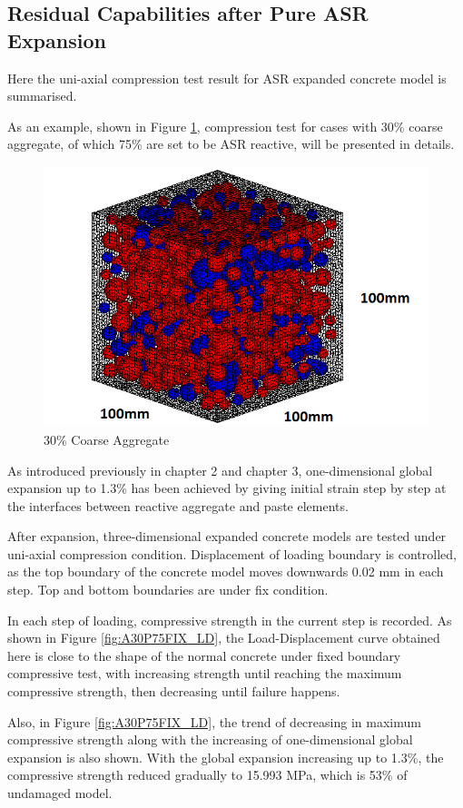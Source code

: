 \clearpage

\subsection{Residual Capabilities after Pure ASR Expansion}

Here the uni-axial compression test result for ASR expanded concrete model is summarised.

As an example, shown in Figure \ref{fig:A30P75_modesl}, compression test for cases with 30\% coarse aggregate, of which 75\% are set to be ASR reactive, will be presented in details.

\begin{figure}[ht!]
\centering
\includegraphics[width=.3\linewidth]{Files/Aggregate/A30P75.png}
  \caption{30\% Coarse Aggregate}
  \label{fig:A30P75_modesl}
\end{figure}

As introduced previously in chapter 2 and chapter 3, one-dimensional global expansion up to 1.3\% has been achieved by giving initial strain step by step at the interfaces between reactive aggregate and paste elements.

After expansion, three-dimensional expanded concrete models are tested under uni-axial compression condition. Displacement of loading boundary is controlled, as the top boundary of the concrete model moves downwards 0.02 mm in each step. Top and bottom boundaries are under fix condition.

In each step of loading, compressive strength in the current step is recorded. As shown in Figure \ref{fig:A30P75FIX_LD}, the Load-Displacement curve obtained here is close to the shape of the normal concrete under fixed boundary compressive test, with increasing strength until reaching the maximum compressive strength, then decreasing until failure happens.

Also, in Figure \ref{fig:A30P75FIX_LD}, the trend of decreasing in maximum compressive strength along with the increasing of one-dimensional global expansion is also shown. With the global expansion increasing up to 1.3\%, the compressive strength reduced gradually to 15.993 MPa, which is 53\% of undamaged model.

